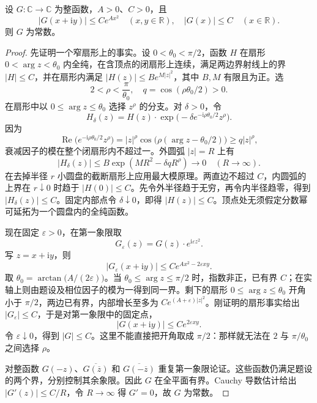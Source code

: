 \begin{lemma}[临界条带增长]\label{b2:thm:20-hardy-entire-lemma}
设 \(G:\mathbb C\to\mathbb C\) 为整函数，\(A>0\)、\(C>0\)，且
\[
 |G(x+\mathrm iy)|\leq C e^{Ax^2}\quad(x,y\in\mathbb R),
 \quad |G(x)|\leq C\quad(x\in\mathbb R).
\]
则 \(G\) 为常数。
\end{lemma}
\begin{proof}
先证明一个窄扇形上的事实。设 \(0<\theta_0<\pi/2\)，函数 \(H\) 在扇形 \(0<\arg z<\theta_0\) 内全纯，在含顶点的闭扇形上连续，满足两边界射线上的界 \(|H|\leq C\)，并在扇形内满足 \(|H(z)|\leq B e^{M|z|^2}\)，其中 \(B,M\) 有限且为正。选
\[
 2<\rho<\frac\pi{\theta_0},
 \quad q=\cos(\rho\theta_0/2)>0.
\]
在扇形中以 \(0\leq\arg z\leq\theta_0\) 选择 \(z^\rho\) 的分支。对 \(\delta>0\)，令
\[
 H_\delta(z)=H(z)\cdot
 \exp\bigl(-\delta e^{-\mathrm i\rho\theta_0/2}z^\rho\bigr).
\]
因为
\[
 \operatorname{Re}\bigl(e^{-\mathrm i\rho\theta_0/2}z^\rho\bigr)
 =|z|^\rho\cos\bigl(\rho(\arg z-\theta_0/2)\bigr)
 \geq q|z|^\rho,
\]
衰减因子的模在整个闭扇形内不超过一。外圆弧 \(|z|=R\) 上有
\[
 |H_\delta(z)|\leq B\exp(MR^2-\delta qR^\rho)
 \longrightarrow0\quad(R\to\infty).
\]
在去掉半径 \(r\) 小圆盘的截断扇形上应用最大模原理。两直边不超过 \(C\)，内圆弧的上界在 \(r\downarrow0\) 时趋于 \(|H(0)|\leq C\)。先令外半径趋于无穷，再令内半径趋零，得到 \(|H_\delta(z)|\leq C\)。固定内部点令 \(\delta\downarrow0\)，即得 \(|H(z)|\leq C\)。顶点处无须假定分数幂可延拓为一个圆盘内的全纯函数。

现在固定 \(\varepsilon>0\)，在第一象限取
\[
 G_\varepsilon(z)=G(z)\cdot e^{\mathrm i\varepsilon z^2}.
\]
写 \(z=x+\mathrm iy\)，则
\[
 |G_\varepsilon(x+\mathrm iy)|
 \leq C e^{Ax^2-2\varepsilon xy}.
\]
取 \(\theta_0=\arctan\bigl(A/(2\varepsilon)\bigr)\)。当 \(\theta_0\leq\arg z\leq\pi/2\) 时，指数非正，已有界 \(C\)；在实轴上则由题设及相位因子的模为一得到同一界。剩下的扇形 \(0\leq\arg z\leq\theta_0\) 开角小于 \(\pi/2\)，两边已有界，内部增长至多为 \(C e^{(A+\varepsilon)|z|^2}\)。刚证明的扇形事实给出 \(|G_\varepsilon|\leq C\)，于是对第一象限中的固定点，
\[
 |G(x+\mathrm iy)|\leq C e^{2\varepsilon xy}.
\]
令 \(\varepsilon\downarrow0\)，得到 \(|G|\leq C\)。这里不能直接把开角取成 \(\pi/2\)：那样就无法在 \(2\) 与 \(\pi/\theta_0\) 之间选择 \(\rho\)。

对整函数 \(G(-z)\)、\(\overline{G(\overline z)}\) 和 \(\overline{G(-\overline z)}\) 重复第一象限论证。这些函数仍满足题设的两个界，分别控制其余象限。因此 \(G\) 在全平面有界。Cauchy 导数估计给出 \(|G'(z)|\leq C/R\)，令 \(R\to\infty\) 得 \(G'=0\)，故 \(G\) 为常数。
\end{proof}

